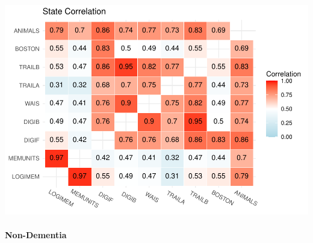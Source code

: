 \documentclass[
]{article}
\begin{document}
\includegraphics{DataAnalysis_files/figure-latex/unnamed-chunk-4-1.pdf}

\hypertarget{non-dementia}{%
\paragraph{Non-Dementia}\label{non-dementia}}

\begingroup\fontsize{7}{9}\selectfont
\end{document}
